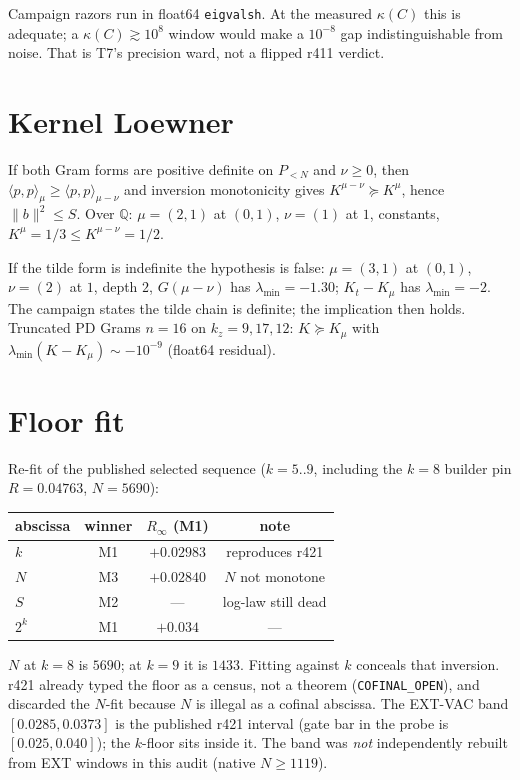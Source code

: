 \documentclass[11pt]{article}
\theoremstyle{remark}
\begin{document}
Campaign razors run in float64
\texttt{eigvalsh}.  At the measured
$\kappa(C)$ this is adequate; a
$\kappa(C)\gtrsim10^{8}$ window would
make a $10^{-8}$ gap indistinguishable
from noise.  That is T7's precision ward,
not a flipped r411 verdict.

\section{Kernel Loewner}\label{sec:T4}

If both Gram forms are positive definite
on $P_{<N}$ and $\nu\ge0$, then
$\langle p,p\rangle_\mu\ge\langle p,p\rangle_{\mu-\nu}$
and inversion monotonicity gives
$K^{\mu-\nu}\succeq K^\mu$, hence
$\|b\|^2\le S$.
Over $\mathbb{Q}$: $\mu=(2,1)$ at $(0,1)$,
$\nu=(1)$ at $1$, constants,
$K^\mu=1/3\le K^{\mu-\nu}=1/2$.

If the tilde form is indefinite the
hypothesis is false: $\mu=(3,1)$ at
$(0,1)$, $\nu=(2)$ at $1$, depth $2$,
$G(\mu-\nu)$ has $\lambda_{\min}=-1.30$;
$K_t-K_\mu$ has $\lambda_{\min}=-2$.
The campaign states the tilde chain is
definite; the implication then holds.
Truncated PD Grams $n=16$ on
$k_z=9,17,12$: $K_{\tilde{}}\succeq K_\mu$
with $\lambda_{\min}(K_{\tilde{}}-K_\mu)
\sim -10^{-9}$ (float64 residual).

\section{Floor fit}\label{sec:T5}

Re-fit of the published selected sequence
($k=5..9$, including the $k=8$ builder pin
$R=0.04763$, $N=5690$):

\begin{center}
\small
\begin{tabular}{@{}lccc@{}}
\toprule
abscissa & winner & $R_\infty$ (M1) & note \\
\midrule
$k$   & M1 & $+0.02983$ & reproduces r421 \\
$N$   & M3 & $+0.02840$ & $N$ not monotone \\
$S$   & M2 & ---        & log-law still dead \\
$2^k$ & M1 & $+0.034$   & --- \\
\bottomrule
\end{tabular}
\end{center}

$N$ at $k=8$ is $5690$; at $k=9$ it is
$1433$.
Fitting against $k$ conceals that inversion.
r421 already typed the floor as a census,
not a theorem (\texttt{COFINAL\_OPEN}),
and discarded the $N$-fit because $N$ is
illegal as a cofinal abscissa.
The EXT-VAC band $[0.0285,0.0373]$ is the
published r421 interval (gate bar in the
probe is $[0.025,0.040]$); the $k$-floor
sits inside it.
The band was \emph{not} independently
rebuilt from EXT windows in this audit
(native $N\ge1119$).
\end{document}
